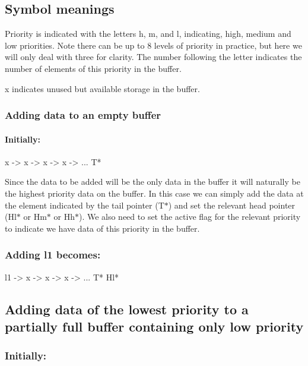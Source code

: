 \subsection*{Symbol meanings}

Priority is indicated with the letters h, m, and l, indicating, high, medium and low priorities. Note there can be up to 8 levels of priority in practice, but here we will only deal with three for clarity. The number following the letter indicates the number of elements of this priority in the buffer.

x indicates unused but available storage in the buffer.

\subsubsection*{Adding data to an empty buffer}

\paragraph*{Initially\+:}


\begin{DoxyCode}
x  ->  x  ->  x  ->  x  ->  ...
T*
\end{DoxyCode}


Since the data to be added will be the only data in the buffer it will naturally be the highest priority data on the buffer. In this case we can simply add the data at the element indicated by the tail pointer (T$\ast$) and set the relevant head pointer (Hl$\ast$ or Hm$\ast$ or Hh$\ast$). We also need to set the active flag for the relevant priority to indicate we have data of this priority in the buffer.

\subsubsection*{Adding l1 becomes\+:}


\begin{DoxyCode}
l1  ->  x  ->  x  ->  x  ->  ...
T*
Hl*
\end{DoxyCode}


\subsection*{Adding data of the lowest priority to a partially full buffer containing only low priority}

\subsubsection*{Initially\+:}


